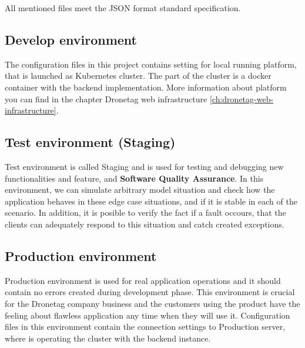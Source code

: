 All mentioned files meet the JSON format standard specification.

\subsection{Develop environment}\label{subsec:develop-environment}
The configuration files in this project contains setting for local running platform, that is launched as Kubernetes cluster.
The part of the cluster is a docker container with the backend implementation.
More information about platform you can find in the chapter Dronetag web infrastructure \ref{ch:dronetag-web-infrastructure}.


\subsection{Test environment (Staging)}\label{subsec:test-environment}
Test environment is called Staging and is used for testing and debugging new functionalities and feature, and \textbf{Software Quality Assurance}.\cite{sqa}
In this environment, we can simulate arbitrary model situation and check how the application behaves in these edge case situations, and if it is stable in each of the scenario.
In addition, it is posible to verify the fact if a fault occours, that the clients can adequately respond to this situation and catch created exceptions.

\subsection{Production environment}\label{subsec:production-environment}
Production environment is used for real application operations and it should contain no errors created during development phase.
This environment is crucial for the Dronetag company business and the customers using the product have the feeling about flawless application any time when they will use it.
Configuration files in this environment contain the connection settings to Production server, where is operating the cluster with the backend instance.
